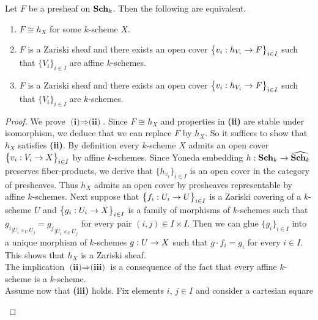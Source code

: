\begin{theorem}
Let $F$ be a presheaf on $\mathbf{Sch}_k$. Then the following are equivalent. 
\begin{enumerate}[label=\emph{\textbf{(\roman*)}}, leftmargin=1.5em]
\item $F\cong h_X$ for some $k$-scheme $X$.
\item $F$ is a Zariski sheaf and there exists an open cover $\big\{v_i:h_{V_i}\rightarrow F\big\}_{i\in I}$ such that $\{V_i\}_{i\in I}$ are affine $k$-schemes.
\item $F$ is a Zariski sheaf and there exists an open cover $\big\{v_i:h_{V_i}\rightarrow F\big\}_{i\in I}$ such that $\{V_i\}_{i\in I}$ are $k$-schemes.
\end{enumerate}
\end{theorem}
\begin{proof}
We prove $\textbf{(i)}\Rightarrow \textbf{(ii)}$. Since $F\cong h_X$ and properties in \textbf{(ii)} are stable under isomorphism, we deduce that we can replace $F$ by $h_X$. So it suffices to show that $h_X$ satisfies \textbf{(ii)}. By definition every $k$-scheme $X$ admits an open cover $\big\{v_i:V_i\rightarrow X\big\}_{i\in I}$ by affine $k$-schemes. Since Yoneda embedding $h:\mathbf{Sch}_k\rightarrow \widehat{\mathbf{Sch}_k}$ preserves fiber-products, we derive that $\big\{h_{v_i}\big\}_{i\in I}$ is an open cover in the category of presheaves. Thus $h_X$ admits an open cover by presheaves representable by affine $k$-schemes. Next suppose that $\big\{f_i:U_i\rightarrow U\big\}_{i\in I}$ is a Zariski covering of a $k$-scheme $U$ and $\big\{g_i:U_i\rightarrow X\big\}_{i\in I}$ is a family of morphisms of $k$-schemes such that ${g_i}_{\mid U_i\times_UU_j}={g_j}_{\mid U_i\times_UU_j}$ for every pair $(i,j)\in I\times I$. Then we can glue $\{g_i\}_{i\in I}$ into a unique morphism of $k$-schemes $g:U\rightarrow X$ such that $g\cdot f_i=g_i$ for every $i\in I$. This shows that $h_X$ is a Zariski sheaf.\\
The implication $\textbf{(ii)}\Rightarrow \textbf{(iii)}$ is a consequence of the fact that every affine $k$-scheme is a $k$-scheme.\\
Assume now that \textbf{(iii)} holds. Fix elements $i$, $j\in I$ and consider a cartesian square
\begin{center}
\end{center}
\end{proof}
